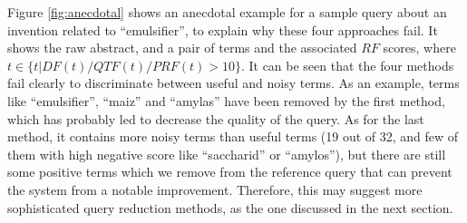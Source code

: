 Figure \ref{fig:anecdotal} shows an anecdotal example for a sample query about an invention related to ``emulsifier'', to explain why these four approaches fail. It shows the raw abstract, and a pair of terms and the associated $\mathit{RF}$ scores, where $t \in \{t| DF(t)/QTF(t)/PRF(t)>10\} $. It can be seen that the four methods fail clearly to discriminate between useful and noisy terms. As an example, terms like ``emulsifier'', ``maiz'' and ``amylas'' have been removed by the first method, which has probably led to decrease the quality of the query. As for the last method, it contains more noisy terms than useful terms (19 out of 32, and few of them with high negative score like ``saccharid'' or ``amylos''), but there are still some positive terms which we remove from the reference query that can prevent the system from a notable improvement.
Therefore, this may suggest more sophisticated query reduction methods, as the one discussed in the next section.
 

